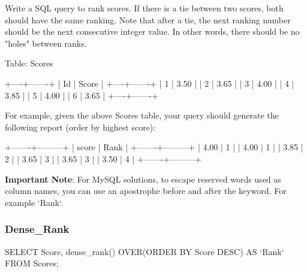 Write a SQL query to rank scores. If there is a tie between two scores, both should have the same ranking. Note that after a tie, the next ranking number should be the next consecutive integer value. In other words, there should be no "holes" between ranks.

Table: Scores
\begin{Code}
+----+-------+
| Id | Score |
+----+-------+
| 1  | 3.50  |
| 2  | 3.65  |
| 3  | 4.00  |
| 4  | 3.85  |
| 5  | 4.00  |
| 6  | 3.65  |
+----+-------+
\end{Code}

For example, given the above Scores table, your query should generate the following report (order by highest score):
\begin{Code}
+-------+---------+
| score | Rank    |
+-------+---------+
| 4.00  | 1       |
| 4.00  | 1       |
| 3.85  | 2       |
| 3.65  | 3       |
| 3.65  | 3       |
| 3.50  | 4       |
+-------+---------+
\end{Code}

\textbf{Important Note}: For MySQL solutions, to escape reserved words used as column names, you can use an apostrophe before and after the keyword. For example `Rank`.

\subsubsection{Dense_Rank}
\begin{Code}
SELECT Score, dense_rank() OVER(ORDER BY Score DESC) AS `Rank` FROM Scores;
\end{Code}